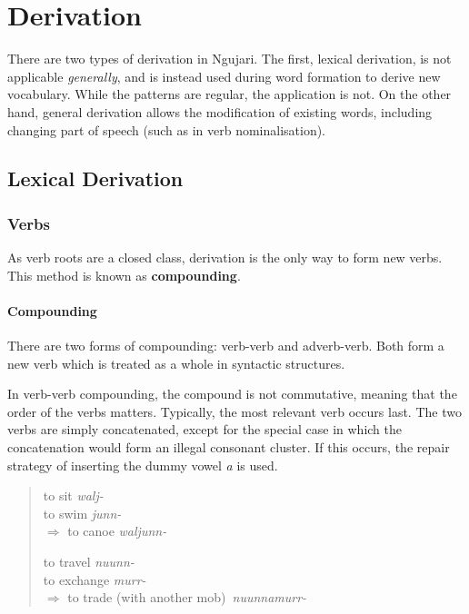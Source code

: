 \chapter{Derivation}

There are two types of derivation in Ngujari. The first, lexical derivation, is
not applicable \textit{generally}, and is instead used during word formation to
derive new vocabulary. While the patterns are regular, the application is not.
On the other hand, general derivation allows the modification of existing words,
including changing part of speech (such as in verb nominalisation).

\section{Lexical Derivation}

\subsection{Verbs}

As verb roots are a closed class, derivation is the only way to form new verbs.
This method is known as \textbf{compounding}.

\subsubsection{Compounding}

There are two forms of compounding: verb-verb and adverb-verb. Both form a new
verb which is treated as a whole in syntactic structures.

In verb-verb compounding, the compound is not commutative, meaning that the
order of the verbs matters. Typically, the most relevant verb occurs last. The
two verbs are simply concatenated, except for the special case in which the
concatenation would form an illegal consonant cluster. If this occurs, the
repair strategy of inserting the dummy vowel \textit{a} is used.

\begin{quote}
\begin{multicols}{2}
to sit \textit{walj-}\\
to swim \textit{junn-}\\
$\Rightarrow$ to canoe \textit{waljunn-}

to travel \textit{nuunn-}\\
to exchange \textit{murr-}\\
$\Rightarrow$ to trade (with another mob)~\textit{nuunnamurr-}
\end{multicols}
\end{quote}

